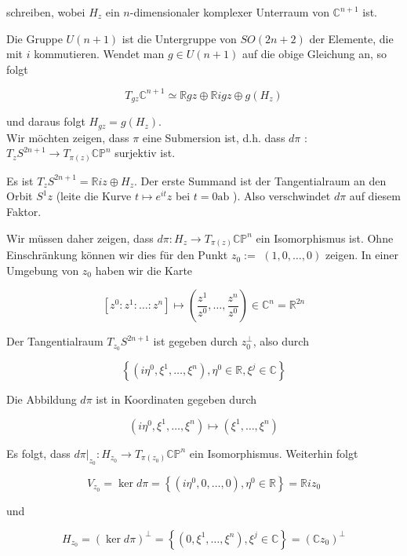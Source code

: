 \documentclass[10pt, letterpaper]{article}
\begin{document}
schreiben, wobei $H_{z}$ ein $n$-dimensionaler komplexer Unterraum von $\mathbb{C}^{n+1}$ ist.

Die Gruppe $U(n+1)$ ist die Untergruppe von $S O(2 n+2)$ der Elemente, die mit $i$ kommutieren. Wendet man $g \in U(n+1)$ auf die obige Gleichung an, so folgt

$$
T_{g z} \mathbb{C}^{n+1} \simeq \mathbb{R} g z \oplus \mathbb{R} i g z \oplus g\left(H_{z}\right)
$$

und daraus folgt $H_{g z}=g\left(H_{z}\right)$.\\
Wir möchten zeigen, dass $\pi$ eine Submersion ist, d.h. dass $d \pi$ : $T_{z} S^{2 n+1} \rightarrow T_{\pi(z)} \mathbb{C P}^{n}$ surjektiv ist.

Es ist $T_{z} S^{2 n+1}=\mathbb{R} i z \oplus H_{z}$. Der erste Summand ist der Tangentialraum an den Orbit $S^{1} z$ (leite die Kurve $t \mapsto e^{i t} z$ bei $t=0 \mathrm{ab}$ ). Also verschwindet $d \pi$ auf diesem Faktor.

Wir müssen daher zeigen, dass $d \pi: H_{z} \rightarrow T_{\pi(z)} \mathbb{C P}^{n}$ ein Isomorphismus ist. Ohne Einschränkung können wir dies für den Punkt $z_{0}:=$ $(1,0, \ldots, 0)$ zeigen. In einer Umgebung von $z_{0}$ haben wir die Karte

$$
\left[z^{0}: z^{1}: \ldots: z^{n}\right] \mapsto\left(\frac{z^{1}}{z^{0}}, \ldots, \frac{z^{n}}{z^{0}}\right) \in \mathbb{C}^{n}=\mathbb{R}^{2 n}
$$

Der Tangentialraum $T_{z_{0}} S^{2 n+1}$ ist gegeben durch $z_{0}^{\perp}$, also durch

$$
\left\{\left(i \eta^{0}, \xi^{1}, \ldots, \xi^{n}\right), \eta^{0} \in \mathbb{R}, \xi^{j} \in \mathbb{C}\right\}
$$

Die Abbildung $d \pi$ ist in Koordinaten gegeben durch

$$
\left(i \eta^{0}, \xi^{1}, \ldots, \xi^{n}\right) \mapsto\left(\xi^{1}, \ldots, \xi^{n}\right)
$$

Es folgt, dass $\left.d \pi\right|_{z_{0}}: H_{z_{0}} \rightarrow T_{\pi\left(z_{0}\right)} \mathbb{C} \mathbb{P}^{n}$ ein Isomorphismus. Weiterhin folgt

$$
V_{z_{0}}=\operatorname{ker} d \pi=\left\{\left(i \eta^{0}, 0, \ldots, 0\right), \eta^{0} \in \mathbb{R}\right\}=\mathbb{R} i z_{0}
$$

und

$$
H_{z_{0}}=(\operatorname{ker} d \pi)^{\perp}=\left\{\left(0, \xi^{1}, \ldots, \xi^{n}\right), \xi^{j} \in \mathbb{C}\right\}=\left(\mathbb{C} z_{0}\right)^{\perp}
$$
\end{document}
